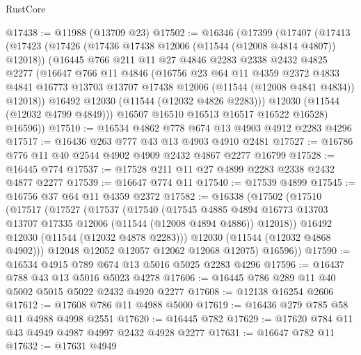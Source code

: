 \begin{lexlean}{RustCore}
\begin{coremodule}
@17438 := @11988 (@13709 @23)
@17502 := @16346
    (@17399
      (@17407
        (@17413
          (@17423
            (@17426 (@17436 @17438 @12006 (@11544 (@12008 @4814 @4807)) @12018))
            (@16445
              @766
              @211
              @11
              @27
              @4846
              @2283
              @2338
              @2432
              @4825
              @2277
              (@16647
                @766
                @11
                @4846
                (@16756
                  @23
                  @64
                  @11
                  @4359
                  @2372
                  @4833
                  @4841
                  @16773
                  @13703
                  @13707
                  @17438
                  @12006
                  (@11544 (@12008 @4841 @4834))
                  @12018))
              @16492
              @12030
              (@11544 (@12032 @4826 @2283)))
            @12030
            (@11544 (@12032 @4799 @4849)))
          @16507
          @16510
          @16513
          @16517
          @16522
          @16528)
        @16596))
@17510 := @16534 @4862 @778 @674 @13 @4903 @4912 @2283 @4296
@17517 := @16436 @263 @777 @43 @13 @4903 @4910 @2481
@17527 := @16786 @776 @11 @40 @2544 @4902 @4909 @2432 @4867 @2277 @16799
@17528 := @16445 @774
@17537 := @17528 @211 @11 @27 @4899 @2283 @2338 @2432 @4877 @2277
@17539 := @16647 @774 @11
@17540 := @17539 @4899
@17545 := @16756 @37 @64 @11 @4359 @2372
@17582 := @16338
    (@17502
      (@17510
        (@17517
          (@17527
            (@17537
              (@17540
                (@17545
                  @4885
                  @4894
                  @16773
                  @13703
                  @13707
                  @17335
                  @12006
                  (@11544 (@12008 @4894 @4886))
                  @12018))
              @16492
              @12030
              (@11544 (@12032 @4878 @2283)))
            @12030
            (@11544 (@12032 @4868 @4902)))
          @12048
          @12052
          @12057
          @12062
          @12068
          @12075)
        @16596))
@17590 := @16534 @4915 @789 @674 @13 @5016 @5025 @2283 @4296
@17596 := @16437 @788 @43 @13 @5016 @5023 @4278
@17606 := @16445 @786 @289 @11 @40 @5002 @5015 @5022 @2432 @4920 @2277
@17608 := @12138 @16254 @2606
@17612 := @17608 @786 @11 @4988 @5000
@17619 := @16436 @279 @785 @58 @11 @4988 @4998 @2551
@17620 := @16445 @782
@17629 := @17620 @784 @11 @43 @4949 @4987 @4997 @2432 @4928 @2277
@17631 := @16647 @782 @11
@17632 := @17631 @4949

\end{coremodule}
\end{lexlean}
